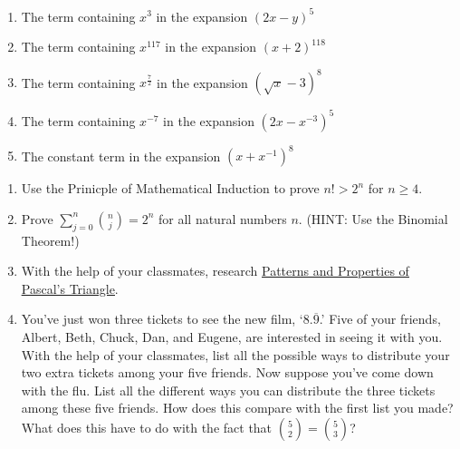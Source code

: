 \documentclass{ximera}
\begin{document}
\begin{enumerate}
\setcounter{enumi}{\value{HW}}

\item  The term containing $x^3$ in the expansion $(2x-y)^{5}$ \label{usebinomfirst}

\item  The term containing $x^{117}$ in the expansion $(x+2)^{118}$

\item  The term containing $x^{\frac{7}{2}}$ in the expansion $\left(\sqrt{x}-3\right)^8$

\item  The term containing $x^{-7}$ in the expansion  $\left(2x - x^{-3} \right)^{5}$

\item  The constant term in the expansion $\left(x + x^{-1} \right)^{8}$ \label{usenbinomlast}

\setcounter{HW}{\value{enumi}}
\end{enumerate}

\begin{enumerate}
\setcounter{enumi}{\value{HW}}

\item  Use the Prinicple of Mathematical Induction to prove $n! > 2^{n}$ for $n \geq	4$.

\item  Prove $\displaystyle{\sum_{j=0}^{n} \binom{n}{j} = 2^{n}}$ for all natural numbers $n$.  (HINT:  Use the Binomial Theorem!)

\item  With the help of your classmates, research \href{http://en.wikipedia.org/wiki/Pascal's_triangle#Patterns_and_properties}{\underline{Patterns and Properties of Pascal's Triangle}}.  

\item  You've just won three tickets to see the new film, `$8.\overline{9}$.'  Five of your friends, Albert, Beth, Chuck, Dan, and Eugene, are interested in seeing it with you.  With the help of your classmates, list all the possible ways to distribute your two extra tickets among your five friends.  Now suppose you've come down with the flu.  List all the different ways you can distribute the three tickets among these five friends.  How does this compare with the first list you made?  What does this have to do with the fact that $\binom{5}{2} = \binom{5}{3}$? 

\setcounter{HW}{\value{enumi}}
\end{enumerate}
\end{document}
